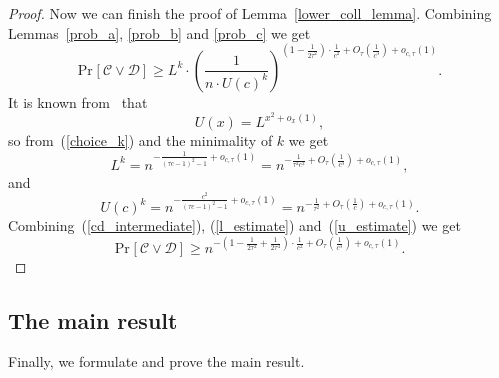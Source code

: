 \documentclass[11pt,letterpaper]{article}
\newcommand{\Prb}[2]{\mathrm{Pr}_{#1}\left[#2\right]}
\newcommand{\Cc}{\mathcal{C}}
\newcommand{\Dc}{\mathcal{D}}
\begin{document}
\begin{proof}
    Now we can finish the proof of Lemma~\ref{lower_coll_lemma}.
    Combining Lemmas~\ref{prob_a}, \ref{prob_b} and \ref{prob_c} we get
    \begin{equation}
        \label{cd_intermediate}
        \Prb{}{\Cc \vee \Dc} \geq
        L^k \cdot 
            \left(\frac{1}{n \cdot U(c)^k}\right)^{\left(1 - \frac{1}{2\tau^2}\right)\cdot \frac{1}{c^2} + O_{\tau}\left(\frac{1}{c^3}\right) + o_{c, \tau}(1)}.
    \end{equation}
    It is known from~\cite{ai-nohaa-06} that
    $$
        U(x) = L^{x^2 + o_x(1)},
    $$
    so from~(\ref{choice_k}) and the minimality of $k$ we get
    \begin{equation}
        \label{l_estimate}
        L^k = n^{-\frac{1}{(\tau c - 1)^2 - 1} + o_{c, \tau}(1)} = n^{-\frac{1}{\tau^2 c^2} + O_{\tau}\left(\frac{1}{c^3}\right) + o_{c,\tau}(1)},
    \end{equation}
    and
    \begin{equation}
        \label{u_estimate}
        U(c)^k = n^{-\frac{c^2}{(\tau c - 1)^2 - 1} + o_{c, \tau}(1)} = n^{-\frac{1}{\tau^2} + O_{\tau}\left(\frac{1}{c}\right) + o_{c,\tau}(1)}.
    \end{equation}
    Combining~(\ref{cd_intermediate}), (\ref{l_estimate}) and~(\ref{u_estimate}) we get
    $$
        \Prb{}{\Cc \vee \Dc} \geq n^{-\left(1 - \frac{1}{2 \tau^2} + \frac{1}{2 \tau^4}\right) \cdot \frac{1}{c^2}
        + O_{\tau}\left(\frac{1}{c^3}\right) + o_{c, \tau}(1)}.
    $$
\end{proof}

\subsection*{The main result}

Finally, we formulate and prove the main result.
\end{document}
